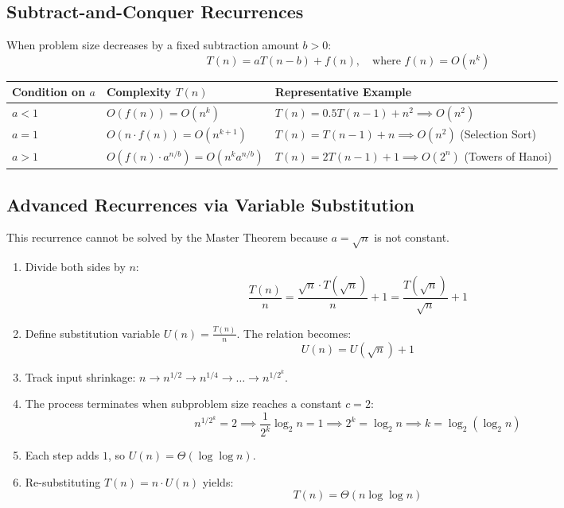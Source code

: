 \documentclass[11pt,a4paper]{article}
\begin{document}
\subsection{Subtract-and-Conquer Recurrences}
When problem size decreases by a fixed subtraction amount $b > 0$:
\[
T(n) = a T(n - b) + f(n), \quad \text{where } f(n) = O(n^k)
\]
\begin{center}
\begin{tabularx}{\textwidth}{l X l}
\toprule
\textbf{Condition on $a$} & \textbf{Complexity $T(n)$} & \textbf{Representative Example} \\
\midrule
$a < 1$ & $O(f(n)) = O(n^k)$ & $T(n) = 0.5 T(n-1) + n^2 \implies O(n^2)$ \\
$a = 1$ & $O(n \cdot f(n)) = O(n^{k+1})$ & $T(n) = T(n-1) + n \implies O(n^2)$ (Selection Sort) \\
$a > 1$ & $O(f(n) \cdot a^{n/b}) = O(n^k a^{n/b})$ & $T(n) = 2 T(n-1) + 1 \implies O(2^n)$ (Towers of Hanoi) \\
\bottomrule
\end{tabularx}
\end{center}

\subsection{Advanced Recurrences via Variable Substitution}
\begin{examplebox}[Solving $T(n) = \sqrt{n} \cdot T(\sqrt{n}) + n$]
This recurrence cannot be solved by the Master Theorem because $a = \sqrt{n}$ is not constant.
\begin{enumerate}
    \item Divide both sides by $n$:
    \[
    \frac{T(n)}{n} = \frac{\sqrt{n} \cdot T(\sqrt{n})}{n} + 1 = \frac{T(\sqrt{n})}{\sqrt{n}} + 1
    \]
    \item Define substitution variable $U(n) = \frac{T(n)}{n}$. The relation becomes:
    \[
    U(n) = U(\sqrt{n}) + 1
    \]
    \item Track input shrinkage: $n \to n^{1/2} \to n^{1/4} \to \dots \to n^{1/2^k}$.
    \item The process terminates when subproblem size reaches a constant $c = 2$:
    \[
    n^{1/2^k} = 2 \implies \frac{1}{2^k} \log_2 n = 1 \implies 2^k = \log_2 n \implies k = \log_2(\log_2 n)
    \]
    \item Each step adds $1$, so $U(n) = \Theta(\log \log n)$.
    \item Re-substituting $T(n) = n \cdot U(n)$ yields:
    \[
    T(n) = \Theta(n \log \log n)
    \]
\end{enumerate}
\end{examplebox}
\end{document}
